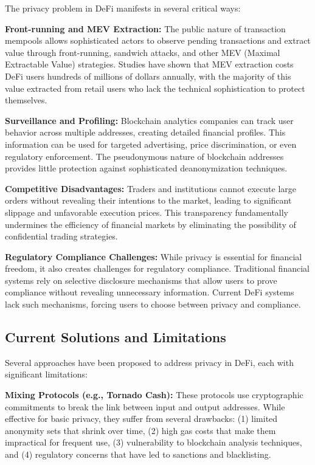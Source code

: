 \documentclass[11pt,a4paper]{article}
\begin{document}
The privacy problem in DeFi manifests in several critical ways:

\textbf{Front-running and MEV Extraction:} The public nature of transaction mempools allows sophisticated actors to observe pending transactions and extract value through front-running, sandwich attacks, and other MEV (Maximal Extractable Value) strategies. Studies have shown that MEV extraction costs DeFi users hundreds of millions of dollars annually, with the majority of this value extracted from retail users who lack the technical sophistication to protect themselves.

\textbf{Surveillance and Profiling:} Blockchain analytics companies can track user behavior across multiple addresses, creating detailed financial profiles. This information can be used for targeted advertising, price discrimination, or even regulatory enforcement. The pseudonymous nature of blockchain addresses provides little protection against sophisticated deanonymization techniques.

\textbf{Competitive Disadvantages:} Traders and institutions cannot execute large orders without revealing their intentions to the market, leading to significant slippage and unfavorable execution prices. This transparency fundamentally undermines the efficiency of financial markets by eliminating the possibility of confidential trading strategies.

\textbf{Regulatory Compliance Challenges:} While privacy is essential for financial freedom, it also creates challenges for regulatory compliance. Traditional financial systems rely on selective disclosure mechanisms that allow users to prove compliance without revealing unnecessary information. Current DeFi systems lack such mechanisms, forcing users to choose between privacy and compliance.

\subsection{Current Solutions and Limitations}

Several approaches have been proposed to address privacy in DeFi, each with significant limitations:

\textbf{Mixing Protocols (e.g., Tornado Cash):} These protocols use cryptographic commitments to break the link between input and output addresses. While effective for basic privacy, they suffer from several drawbacks: (1) limited anonymity sets that shrink over time, (2) high gas costs that make them impractical for frequent use, (3) vulnerability to blockchain analysis techniques, and (4) regulatory concerns that have led to sanctions and blacklisting.
\end{document}
